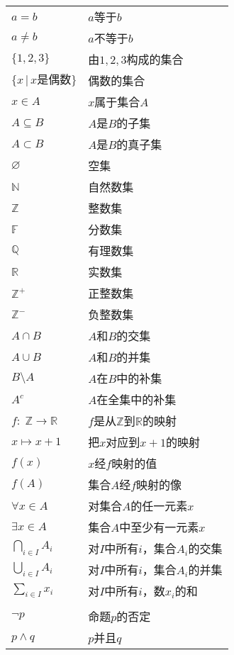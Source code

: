 \documentclass[12pt,UTF8]{article}
\begin{document}
\setlength{\extrarowheight}{3pt}
\begin{longtable}{ m{15em} m{15em} }
    $a = b$ & $a$等于$b$ \\
    $a \neq b$ & $a$不等于$b$ \\
    $\{1,2,3\}$ & 由$1,2,3$构成的集合 \\ 
    $\{x \, | \, x\mbox{是偶数}\}$ & 偶数的集合 \\  
    $x\in A$ & $x$属于集合$A$ \\
    $A \subseteq B$ & $A$是$B$的子集 \\
    $A \subset B$ & $A$是$B$的真子集 \\
    $\varnothing$ & 空集 \\
    $\mathbb{N}$ & 自然数集 \\
    $\mathbb{Z}$ & 整数集 \\
    $\mathbb{F}$ & 分数集 \\
    $\mathbb{Q}$ & 有理数集 \\
    $\mathbb{R}$ & 实数集 \\
    $\mathbb{Z}^+$ & 正整数集 \\
    $\mathbb{Z}^-$ & 负整数集 \\
    $A\cap B$ & $A$和$B$的交集 \\
    $A\cup B$ & $A$和$B$的并集 \\
    $B\setminus A$ & $A$在$B$中的补集 \\
    $A^c$ & $A$在全集中的补集 \\
    $f:\; \mathbb{Z} \rightarrow \mathbb{R}$ & $f$是从$\mathbb{Z}$到$\mathbb{R}$的映射 \\
    $x\mapsto x+1$ & 把$x$对应到$x+1$的映射 \\
    $f(x)$ & $x$经$f$映射的值 \\
    $f(A)$ & 集合$A$经$f$映射的像 \\
    $\forall x \in A$ & 对集合$A$的任一元素$x$ \\
    $\exists x \in A$ & 集合$A$中至少有一元素$x$ \\
    $\displaystyle\bigcap_{i\in I} A_i$ & 对$I$中所有$i$，集合$A_i$的交集 \\
    $\displaystyle\bigcup_{i\in I} A_i$ & 对$I$中所有$i$，集合$A_i$的并集 \\
    $\displaystyle\sum_{i\in I} x_i$ & 对$I$中所有$i$，数$x_i$的和 \\
    & \\
    $\neg p$ & 命题$p$的否定 \\
    $p \wedge q$ & $p$并且$q$ \\

\end{longtable}
\end{document}
